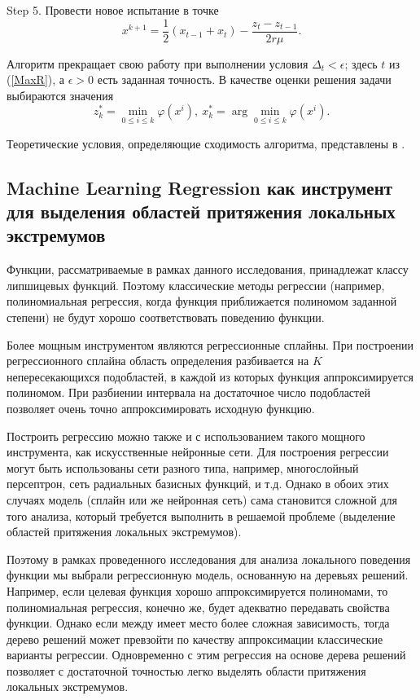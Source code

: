 \documentclass[entropy,article,submit,moreauthors,pdftex]{Definitions/mdpi}
\begin{document}
Step 5. Провести новое испытание в точке
\begin{equation}\label{xk1}
x^{k+1}=\frac{1}{2}(x_{t-1}+x_t) - \frac{z_t-z_{t-1}}{2r\mu}.
\end{equation}

Алгоритм прекращает свою работу при выполнении условия $\Delta_t<\epsilon$; здесь $t$ из (\ref{MaxR}), а $\epsilon>0$ есть заданная точность. 
В качестве оценки решения задачи выбираются значения 
\[
z_k^\ast=\min_{0\leq i \leq k}\varphi(x^i), \ x_k^\ast=\arg \min_{0\leq i \leq
 k}\varphi(x^i).
\] 

Теоретические условия, определяющие сходимость алгоритма, представлены в \cite{Strongin2000}.



\subsection{Machine Learning Regression как инструмент для выделения областей притяжения локальных экстремумов}\label{TreeGSA}

Функции, рассматриваемые в рамках данного исследования, принадлежат классу липшицевых функций. Поэтому классические методы регрессии (например, полиномиальная регрессия, когда функция приближается полиномом заданной степени) не будут хорошо соответствовать поведению функции. 

Более мощным инструментом являются регрессионные сплайны. При построении регрессионного сплайна область определения разбивается на $K$ непересекающихся подобластей, в каждой из которых функция аппроксимируется полиномом. При разбиении интервала на достаточное число подобластей позволяет очень точно аппроксимировать исходную функцию. 

Построить регрессию можно также и с использованием такого мощного инструмента, как искусственные нейронные сети. 
Для построения регрессии могут быть использованы сети разного типа, например, многослойный персептрон, сеть радиальных базисных функций, и т.д. 
Однако в обоих этих случаях модель (сплайн или же нейронная сеть) сама становится сложной для того анализа, который требуется выполнить в решаемой проблеме (выделение областей притяжения локальных экстремумов). 

Поэтому в рамках проведенного исследования для анализа локального поведения функции мы выбрали регрессионную модель, основанную на деревьях решений. 
Например, если целевая функция хорошо аппроксимируется полиномами, то полиномиальная регрессия, конечно же, будет адекватно передавать свойства функции. Однако если между имеет место более сложная зависимость, тогда дерево решений может превзойти по качеству аппроксимации классические варианты регрессии.
Одновременно с этим регрессия на основе дерева решений позволяет с достаточной точностью легко выделять области притяжения локальных экстремумов.
\end{document}
